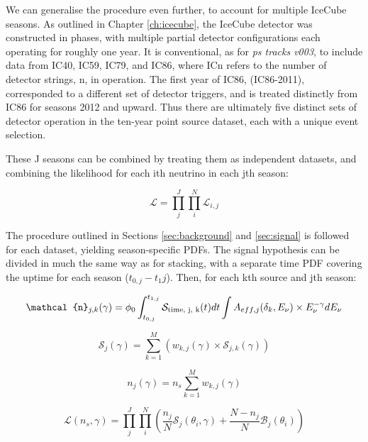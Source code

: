 We can generalise the procedure even further, to account for multiple IceCube seasons. As outlined in Chapter \ref{ch:icecube}, the IceCube detector was constructed in phases, with multiple partial detector configurations each operating for roughly one year. It is conventional, as for \emph{ps tracks v003}, to include data from IC40, IC59, IC79, and IC86, where ICn refers to the number of detector strings, n,  in operation. The first year of IC86, (IC86-2011), corresponded to a different set of detector triggers, and is treated distinctly from IC86 for seasons 2012 and upward. Thus there are ultimately five distinct sets of detector operation in the ten-year point source dataset, each with a unique event selection.

These J seasons can be combined by treating them as independent datasets, and combining the likelihood for each ith neutrino in each jth season:

\begin{equation}
\mathcal{L} = \prod_{j}^{J}\prod_{i}^{N} \mathcal{L}_{i, j}
\end{equation}

The procedure outlined in Sections \ref{sec:background} and \ref{sec:signal} is followed for each dataset, yielding season-specific PDFs. The signal hypothesis can be divided in much the same way as for stacking, with a separate time PDF covering the uptime for each season ($t_{0, j} - t_1{j}$). Then, for each kth source and jth season:

\begin{equation}
\mathcal{n}_{j, k} (\gamma) = \phi_{0} \int_{t_{0, j}}^{t_{1,j}} \mathcal{S}_{\textup{time, j, k}}(t) dt \int A_{eff, j}(\delta_{k}, E_{\nu}) \times E_{\nu}^{-\gamma} dE_{\nu}
\label{eq:n_k_full}
\end{equation}

\begin{equation}
\mathcal{S}_{j}(\gamma) = \sum^{M}_{k=1} \left( w_{k, j}(\gamma)  \times \mathcal{S}_{j, k}(\gamma)  \right)
\label{eq:S_stacked_season}
\end{equation}

\begin{equation}
n_{j}(\gamma) = n_{s} \sum^{M}_{k=1} w_{k, j}(\gamma)
\label{eq:n_j}
\end{equation}

\begin{equation}
\mathcal{L}(n_{s}, \gamma) = \prod_{j}^{J} \prod_{i}^{N} \left(\frac{n_{j}}{N} \mathcal{S}_{j}(\theta_{i}, \gamma) + \frac{N - n_{j}}{N} \mathcal{B}_{j}(\theta_{i})  \right)
\label{eq:ps_llh_seasons}
\end{equation}

